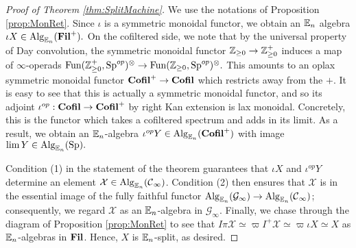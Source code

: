 \begin{proof}[Proof of Theorem \ref{thm:SplitMachine}]
We use the notations of Proposition \ref{prop:MonRet}.  Since $\iota$ is a symmetric monoidal functor, we obtain an $\operatorname{\mathbb{E}}_n$ algebra $\iota X \in \operatorname{\mathrm{Alg}}_{\operatorname{\mathbb{E}}_n}(\operatorname{\mathbf{Fil}}^+).$  
On the cofiltered side, we note that by the universal property of Day convolution, the symmetric monoidal functor $\operatorname{\mathbb{Z}}_{\geq 0} \to \operatorname{\mathbb{Z}}_{\geq 0}^+$ induces a map of $\infty$-operads $\operatorname{\text{Fun}}(\operatorname{\mathbb{Z}}_{\geq 0}^+, \operatorname{\mathrm{Sp}}^{op})^{\otimes} \to \operatorname{\text{Fun}}(\operatorname{\mathbb{Z}}_{\geq 0},\operatorname{\mathrm{Sp}}^{op})^{\otimes}.$  This amounts to an oplax symmetric monoidal functor $\operatorname{\mathbf{Cofil}}^+\to \operatorname{\mathbf{Cofil}}$ which restricts away from the $+$.  It is easy to see that this is actually a symmetric monoidal functor, and so its adjoint $\iota^{op}: \operatorname{\mathbf{Cofil}} \to \operatorname{\mathbf{Cofil}}^+$ by right Kan extension is lax monoidal.  Concretely, this is the functor which takes a cofiltered spectrum and adds in its limit.  As a result, we obtain an $\operatorname{\mathbb{E}}_n$-algebra $\iota^{op}Y \in \operatorname{\mathrm{Alg}}_{\operatorname{\mathbb{E}}_n}(\operatorname{\mathbf{Cofil}}^+)$ with image $\lim Y\in \operatorname{\mathrm{Alg}}_{\operatorname{\mathbb{E}}_n}(\operatorname{\mathrm{Sp}}).$  

Condition (1) in the statement of the theorem guarantees that $\iota X$ and $\iota^{op}Y$ determine an element $\mathcal{X} \in \operatorname{\mathrm{Alg}}_{\operatorname{\mathbb{E}}_n}(\operatorname{\mathcal{C}}_{\infty})$.  Condition (2) then ensures that $\mathcal{X}$ is in the essential image of the fully faithful functor $\operatorname{\mathrm{Alg}}_{\operatorname{\mathbb{E}}_n}(\mathcal{G}_\infty) \to \operatorname{\mathrm{Alg}}_{\operatorname{\mathbb{E}}_n}(\operatorname{\mathcal{C}}_\infty)$; consequently, we regard $\mathcal{X}$ as an $\operatorname{\mathbb{E}}_n$-algebra in $\mathcal{G}_{\infty}$.  Finally, we chase through the diagram of Proposition \ref{prop:MonRet} to see that $I\pi \mathcal{X} \simeq \varpi I^+ \mathcal{X} \simeq \varpi \iota X \simeq X$ as $\operatorname{\mathbb{E}}_n$-algebras in $\operatorname{\mathbf{Fil}}$.   Hence, $X$ is $\operatorname{\mathbb{E}}_n$-split, as desired. 
\end{proof}




